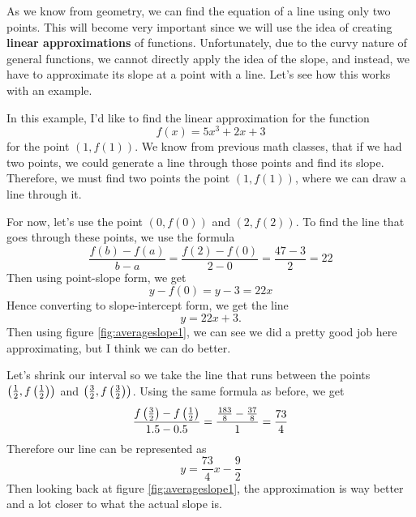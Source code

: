 As we know from geometry, we can find the equation of a line using only two points. This will become very important since we will use the idea of creating \textbf{linear approximations} of functions. Unfortunately, due to the curvy nature of general functions, we cannot directly apply the idea of the slope, and instead, we have to approximate its slope at a point with a line. Let's see how this works with an example.
\begin{ex}
	In this example, I'd like to find the linear approximation for the function
	$$f(x)=5x^3+2x+3$$
	for the point $(1,f(1))$. 
	We know from previous math classes, that if we had two points, we could generate a line through those points and find its slope. Therefore, we must find two points the point $(1,f(1))$, where we can draw a line through it.
	
	For now, let's use the point $(0,f(0))$ and $(2,f(2))$. To find the line that goes through these points, we use the formula
	$$\frac{f(b)-f(a)}{b-a}=\frac{f(2)-f(0)}{2-0}=\frac{47-3}{2}=22$$
	Then using point-slope form, we get 
	$$y-f(0)=y-3=22x$$
	Hence converting to slope-intercept form, we get the line
	$$y=22x+3.$$
	Then using figure \eqref{fig:averageslope1}, we can see we did a pretty good job here approximating, but I think we can do better.
	
	\begin{figure}[h]
	\centering
		\caption{}
		\label{fig:averageslope1}
	\end{figure}
	
	Let's shrink our interval so we take the line that runs between the points $\left(\frac{1}{2},f\left(\frac{1}{2}\right)\right)$ and $\left(\frac{3}{2},f\left(\frac{3}{2}\right)\right)$.
	Using the same formula as before, we get
	$$\frac{f\left(\frac{3}{2}\right)-f\left(\frac{1}{2}\right)}{1.5-0.5}=\frac{\frac{183}{8}-\frac{37}{8}}{1}=\frac{73}{4}$$
	Therefore our line can be represented as
	$$y=\frac{73 }{4}x-\frac{9}{2}$$
	Then looking back at figure \eqref{fig:averageslope1}, the approximation is way better and a lot closer to what the actual slope is.
\end{ex}

